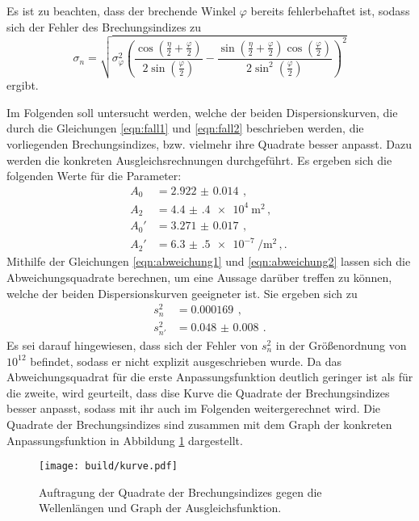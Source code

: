 Es ist zu beachten, dass
der brechende Winkel $\varphi$ bereits fehlerbehaftet ist, sodass sich der Fehler
des Brechungsindizes zu
\begin{equation*}
  \sigma_n = \sqrt{
   \sigma_{\varphi}^{2} \left(\frac{\cos{\left (\frac{\eta}{2} + \frac{\varphi}{2} \right )}}{2 \sin{\left (\frac{\varphi}{2} \right )}} - \frac{\sin{\left (\frac{\eta}{2}
  + \frac{\varphi}{2} \right )} \cos{\left (\frac{\varphi}{2} \right )}}{2 \sin^{2}{\left (\frac{\varphi}{2} \right )}}\right)^{2}}
\end{equation*}
ergibt.

Im Folgenden soll untersucht werden, welche der beiden Dispersionskurven, die durch die
Gleichungen \eqref{eqn:fall1} und \eqref{eqn:fall2} beschrieben werden, die vorliegenden
Brechungsindizes, bzw. vielmehr ihre Quadrate besser anpasst. Dazu werden die konkreten
Ausgleichsrechnungen durchgeführt. Es ergeben sich die folgenden Werte für die Parameter:
\begin{align*}
  A_0 &= \SI{2.922(14)}{}\,,\\
  A_2 &= \SI{4.4(4)e4}{\meter\squared}\,,\\
  A_0' &= \SI{3.271(17)}{}\,,\\
  A_2' &= \SI{6.3(5)e-7}{\per\meter\squared}\,,.\
\end{align*}
Mithilfe der Gleichungen \eqref{eqn:abweichung1} und \eqref{eqn:abweichung2} lassen sich die Abweichungsquadrate
berechnen, um eine Aussage darüber treffen zu können, welche der beiden Dispersionskurven
geeigneter ist. Sie ergeben sich zu
\begin{align*}
  s_n^2 &= \SI{0.000169}{}\,,\\
  s_{n'}^2 &= \SI{0.048(8)}{}\,.
\end{align*}
Es sei darauf hingewiesen, dass sich der Fehler von $s_n^2$ in der Größenordnung
von $10^{12}$ befindet, sodass er nicht explizit ausgeschrieben wurde.
Da das Abweichungsquadrat für die erste Anpassungsfunktion deutlich geringer ist als für
die zweite, wird geurteilt, dass dise Kurve die Quadrate der Brechungsindizes besser anpasst,
sodass mit ihr auch im Folgenden weitergerechnet wird.
Die Quadrate der Brechungsindizes sind zusammen mit dem Graph der konkreten Anpassungsfunktion
in Abbildung \ref{fig:kurve} dargestellt.

\begin{figure}
  \centering
  \texttt{[image: build/kurve.pdf]}
  \caption{Auftragung der Quadrate der Brechungsindizes gegen die Wellenlängen und Graph der Ausgleichsfunktion.}
  \label{fig:kurve}
\end{figure}

